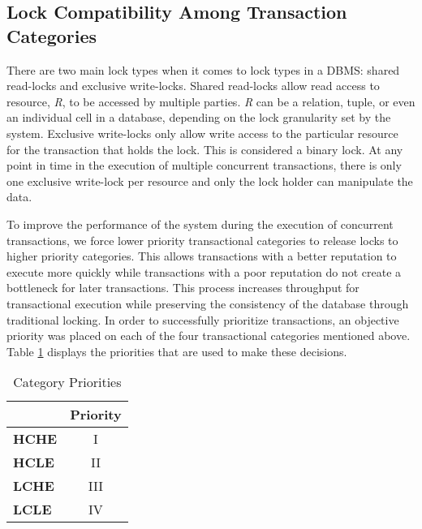 \documentclass[conference]{IEEEtran}
\begin{document}
\subsection{Lock Compatibility Among Transaction Categories}

There are two main lock types when it comes to lock types in a DBMS: shared read-locks and exclusive write-locks. Shared read-locks allow read access to resource, \textit{R}, to be accessed by multiple parties. \textit{R} can be a relation, tuple, or even an individual cell in a database, depending on the lock granularity set by the system. Exclusive write-locks only allow write access to the particular resource for the transaction that holds the lock. This is considered a binary lock. At any point in time in the execution of multiple concurrent transactions, there is only one exclusive write-lock per resource and only the lock holder can manipulate the data.

To improve the performance of the system during the execution of concurrent transactions, we force lower priority transactional categories to release locks to higher priority categories. This allows transactions with a better reputation to execute more quickly while transactions with a poor reputation do not create a bottleneck for later transactions. This process increases throughput for transactional execution while preserving the consistency of the database through traditional locking. In order to successfully prioritize transactions, an objective priority was placed on each of the four transactional categories mentioned above. Table \ref{tbl:priority} displays the priorities that are used to make these decisions.

\begin{table}[h]
\captionsetup{justification=centering}
\centering
\begin{tabular}{l|c|}
\cline{2-2}
                                          & \multicolumn{1}{l|}{\textbf{Priority}} \\ \hline
\multicolumn{1}{|l|}{\textbf{HCHE}}  & I                                      \\ \hline
\multicolumn{1}{|l|}{\textbf{HCLE}}  & II                                     \\ \hline
\multicolumn{1}{|l|}{\textbf{LCHE}} & III                                     \\ \hline
\multicolumn{1}{|l|}{\textbf{LCLE}} & IV                                      \\ \hline
\end{tabular}

\caption{Category Priorities} %
\label{tbl:priority} %

\end{table}
\end{document}
